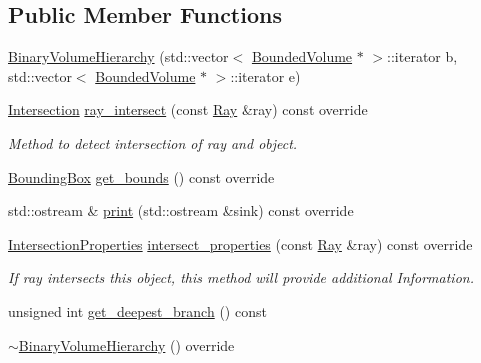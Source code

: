 \subsection*{Public Member Functions}
\begin{DoxyCompactItemize}
\item 
\mbox{\hyperlink{classBinaryVolumeHierarchy_afb1953933b78a2005884a7a34cb64519}{Binary\+Volume\+Hierarchy}} (std\+::vector$<$ \mbox{\hyperlink{classBoundedVolume}{Bounded\+Volume}} $\ast$ $>$\+::iterator b, std\+::vector$<$ \mbox{\hyperlink{classBoundedVolume}{Bounded\+Volume}} $\ast$ $>$\+::iterator e)
\item 
\mbox{\hyperlink{classIntersection}{Intersection}} \mbox{\hyperlink{classBinaryVolumeHierarchy_aae4af0a21170bb122692314b0fbf399a}{ray\+\_\+intersect}} (const \mbox{\hyperlink{classRay}{Ray}} \&ray) const override
\begin{DoxyCompactList}\small\item\em Method to detect intersection of ray and object. \end{DoxyCompactList}\item 
\mbox{\hyperlink{classBoundingBox}{Bounding\+Box}} \mbox{\hyperlink{classBinaryVolumeHierarchy_aaec23515bc9d81ccc9115489aed8808f}{get\+\_\+bounds}} () const override
\item 
std\+::ostream \& \mbox{\hyperlink{classBinaryVolumeHierarchy_ad92d27372aef59591ddc239685ca770d}{print}} (std\+::ostream \&sink) const override
\item 
\mbox{\hyperlink{classIntersectionProperties}{Intersection\+Properties}} \mbox{\hyperlink{classBinaryVolumeHierarchy_a91c6b8be167dd13ddbb874d4b9f0cedb}{intersect\+\_\+properties}} (const \mbox{\hyperlink{classRay}{Ray}} \&ray) const override
\begin{DoxyCompactList}\small\item\em If ray intersects this object, this method will provide additional Information. \end{DoxyCompactList}\item 
unsigned int \mbox{\hyperlink{classBinaryVolumeHierarchy_a07a44c476538de97a8c6a2377ad7bb91}{get\+\_\+deepest\+\_\+branch}} () const
\item 
\mbox{\hyperlink{classBinaryVolumeHierarchy_a760800685de78279be3619c4ee4170cf}{$\sim$\+Binary\+Volume\+Hierarchy}} () override
\end{DoxyCompactItemize}

